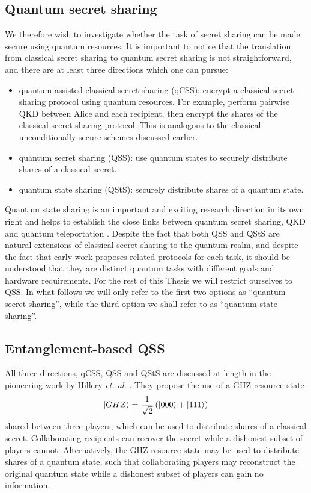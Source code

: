 \subsection{Quantum secret sharing}
We therefore wish to investigate whether the task of secret sharing can be made secure using quantum resources. It is important to notice that the translation from classical secret sharing to quantum secret sharing is not straightforward, and there are at least three directions which one can pursue:

\begin{itemize}
\item quantum-assisted classical secret sharing (qCSS): encrypt a classical secret sharing protocol \cite{Shamir1976, Blakley1979} using quantum resources. For example, perform pairwise QKD between Alice and each recipient, then encrypt the shares of the classical secret sharing protocol. This is analogous to the classical unconditionally secure schemes discussed earlier.
\item quantum secret sharing (QSS): use quantum states to securely distribute shares of a classical secret.
\item quantum state sharing (QStS): securely distribute shares of a quantum state.
\end{itemize}

Quantum state sharing is an important and exciting research direction in its own right and helps to establish the close links between quantum secret sharing, QKD and quantum teleportation \cite{Braunstein1998, Hillery1999, Markham2008a}. Despite the fact that both QSS and QStS are natural extensions of classical secret sharing to the quantum realm, and despite the fact that early work \cite{Hillery1999} proposes related protocols for each task, it should be understood that they are distinct quantum tasks with different goals and hardware requirements. For the rest of this Thesis we will restrict ourselves to QSS. In what follows we will only refer to the first two options as ``quantum secret sharing'', while the third option we shall refer to as ``quantum state sharing''.

\subsection{Entanglement-based QSS}


All three directions, qCSS, QSS and QStS are discussed at length in the pioneering work by Hillery \emph{et. al.} \cite{Hillery1999}. They propose the use of a GHZ resource state
\begin{equation}
\ket{GHZ} = \frac{1}{\sqrt{2}} \left(\ket{000} + \ket{111} \right)
\end{equation}
shared between three players, which can be used to distribute shares of a classical secret. Collaborating recipients can recover the secret while a dishonest subset of players cannot. Alternatively, the GHZ resource state may be used to distribute shares of a quantum state, such that collaborating players may reconstruct the original quantum state while a dishonest subset of players can gain no information.

